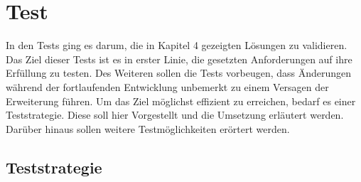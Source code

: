 \label{Test_Kapitel}
\section{Test}
In den Tests ging es darum, die in Kapitel 4 gezeigten Lösungen zu validieren.
Das Ziel dieser Tests ist es in erster Linie, die gesetzten Anforderungen auf ihre Erfüllung zu testen. Des Weiteren sollen die Tests vorbeugen, dass Änderungen während der fortlaufenden Entwicklung unbemerkt zu einem Versagen der Erweiterung führen. Um das Ziel möglichst effizient zu erreichen, bedarf es einer Teststrategie. Diese soll hier Vorgestellt und die Umsetzung erläutert werden. Darüber hinaus sollen weitere Testmöglichkeiten erörtert werden.
\subsection{Teststrategie}
